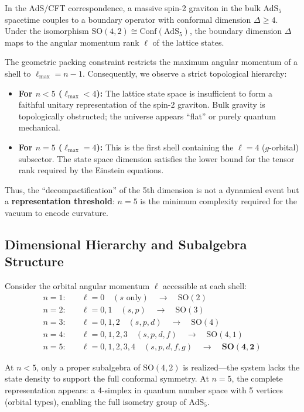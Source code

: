 \documentclass[aps,prd,twocolumn,superscriptaddress,floatfix]{revtex4-2}
\newcommand{\SO}{\ensuremath{\text{SO}}}
\begin{document}
In the AdS/CFT correspondence, a massive spin-2 graviton in the bulk AdS$_5$ spacetime couples to a boundary operator with conformal dimension $\Delta \geq 4$. Under the isomorphism $\SO(4,2) \cong \text{Conf}(\text{AdS}_5)$, the boundary dimension $\Delta$ maps to the angular momentum rank $\ell$ of the lattice states.

The geometric packing constraint restricts the maximum angular momentum of a shell to $\ell_{\max} = n-1$. Consequently, we observe a strict topological hierarchy:

\begin{itemize}
\item \textbf{For $n < 5$ ($\ell_{\max} < 4$):} The lattice state space is insufficient to form a faithful unitary representation of the spin-2 graviton. Bulk gravity is topologically obstructed; the universe appears ``flat'' or purely quantum mechanical.

\item \textbf{For $n = 5$ ($\ell_{\max} = 4$):} This is the first shell containing the $\ell=4$ ($g$-orbital) subsector. The state space dimension satisfies the lower bound for the tensor rank required by the Einstein equations.
\end{itemize}

Thus, the ``decompactification'' of the 5th dimension is not a dynamical event but a \textbf{representation threshold}: $n=5$ is the minimum complexity required for the vacuum to encode curvature.

\subsection{Dimensional Hierarchy and Subalgebra Structure}

Consider the orbital angular momentum $\ell$ accessible at each shell:
\begin{align}
n=1: &\quad \ell=0 \quad (s \text{ only}) \quad \to \quad \SO(2) \\
n=2: &\quad \ell=0,1 \quad (s,p) \quad \to \quad \SO(3) \\
n=3: &\quad \ell=0,1,2 \quad (s,p,d) \quad \to \quad \SO(4) \\
n=4: &\quad \ell=0,1,2,3 \quad (s,p,d,f) \quad \to \quad \SO(4,1) \\
n=5: &\quad \ell=0,1,2,3,4 \quad (s,p,d,f,g) \quad \to \quad \mathbf{\SO(4,2)}
\end{align}

At $n < 5$, only a proper subalgebra of $\SO(4,2)$ is realized---the system lacks the state density to support the full conformal symmetry. At $n=5$, the complete representation appears: a 4-simplex in quantum number space with 5 vertices (orbital types), enabling the full isometry group of AdS$_5$.
\end{document}
